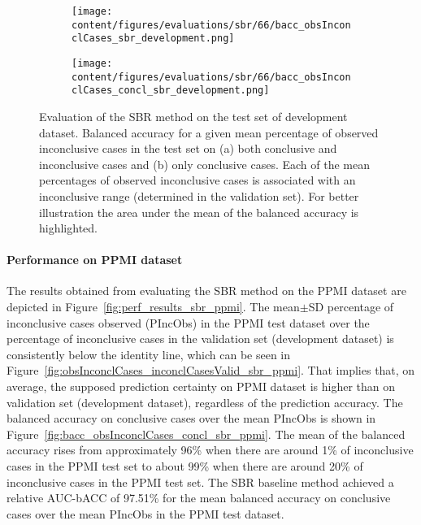 \begin{figure}[ht]
    \begin{subfigure}{0.5\textwidth}
      \centering
      \texttt{[image: content/figures/evaluations/sbr/66/bacc\_obsInconclCases\_sbr\_development.png]}
      \subcaption{}
      \label{fig:bacc_obsInconclCases_sbr_development}
    \end{subfigure}
    \hfill
    \begin{subfigure}{0.5\textwidth}
      \centering
      \texttt{[image: content/figures/evaluations/sbr/66/bacc\_obsInconclCases\_concl\_sbr\_development.png]}
      \subcaption{}
      \label{fig:bacc_obsInconclCases_concl_sbr_development}
    \end{subfigure}

    \caption{Evaluation of the SBR method on the test set of development dataset.
    Balanced accuracy for a given mean percentage of observed inconclusive cases in the test set on 
    (a) both conclusive and inconclusive cases and (b) only conclusive cases. 
    Each of the mean percentages of observed inconclusive cases is associated with an inconclusive range (determined in the validation set).
    For better illustration the area under the mean of the balanced accuracy is highlighted.}
    \label{fig:bacc_obsInconclCases_sbr_development_full}
\end{figure}




\paragraph{Performance on PPMI dataset}

The results obtained from evaluating the SBR method on the PPMI dataset 
are depicted in Figure~\ref{fig:perf_results_sbr_ppmi}.
The mean$\pm$SD percentage of inconclusive cases observed (PIncObs) in the PPMI test dataset 
over the percentage of inconclusive cases in the validation set (development dataset) 
is consistently below the identity line, 
which can be seen in Figure~\ref{fig:obsInconclCases_inconclCasesValid_sbr_ppmi}.
That implies that, on average, the supposed prediction certainty on PPMI dataset is higher than on validation set (development dataset),
regardless of the prediction accuracy.
The balanced accuracy on conclusive cases over the mean PIncObs is shown 
in Figure~\ref{fig:bacc_obsInconclCases_concl_sbr_ppmi}.
The mean of the balanced accuracy rises from approximately 96\% 
when there are around 1\% of inconclusive cases in the PPMI test set to about 99\% 
when there are around 20\% of inconclusive cases in the PPMI test set.
The SBR baseline method achieved a relative AUC-bACC of 97.51\% for the mean balanced accuracy on conclusive cases 
over the mean PIncObs in the PPMI test dataset.


